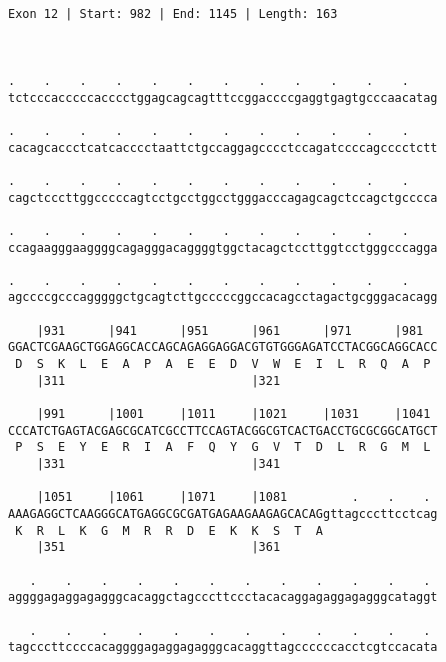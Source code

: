 \documentclass{article}
\begin{document}
\begin{Verbatim}
                  
 
Exon 12 | Start: 982 | End: 1145 | Length: 163



.    .    .    .    .    .    .    .    .    .    .    .    
tctcccacccccacccctggagcagcagtttccggaccccgaggtgagtgcccaacatag
                                                            
.    .    .    .    .    .    .    .    .    .    .    .    
cacagcaccctcatcacccctaattctgccaggagcccctccagatccccagcccctctt
                                                            
.    .    .    .    .    .    .    .    .    .    .    .    
cagctcccttggcccccagtcctgcctggcctgggacccagagcagctccagctgcccca
                                                            
.    .    .    .    .    .    .    .    .    .    .    .    
ccagaagggaaggggcagagggacaggggtggctacagctccttggtcctgggcccagga
                                                            
.    .    .    .    .    .    .    .    .    .    .    .    
agccccgcccagggggctgcagtcttgcccccggccacagcctagactgcgggacacagg
                                                            
    |931      |941      |951      |961      |971      |981  
GGACTCGAAGCTGGAGGCACCAGCAGAGGAGGACGTGTGGGAGATCCTACGGCAGGCACC
 D  S  K  L  E  A  P  A  E  E  D  V  W  E  I  L  R  Q  A  P 
    |311                          |321                      
  
    |991      |1001     |1011     |1021     |1031     |1041 
CCCATCTGAGTACGAGCGCATCGCCTTCCAGTACGGCGTCACTGACCTGCGCGGCATGCT
 P  S  E  Y  E  R  I  A  F  Q  Y  G  V  T  D  L  R  G  M  L 
    |331                          |341                      
  
    |1051     |1061     |1071     |1081         .    .    . 
AAAGAGGCTCAAGGGCATGAGGCGCGATGAGAAGAAGAGCACAGgttagcccttcctcag
 K  R  L  K  G  M  R  R  D  E  K  K  S  T  A                
    |351                          |361                      
  
   .    .    .    .    .    .    .    .    .    .    .    . 
aggggagaggagagggcacaggctagcccttccctacacaggagaggagagggcataggt
                                                            
   .    .    .    .    .    .    .    .    .    .    .    . 
tagcccttccccacaggggagaggagagggcacaggttagccccccacctcgtccacata
                                                            

\end{Verbatim}
\end{document}
